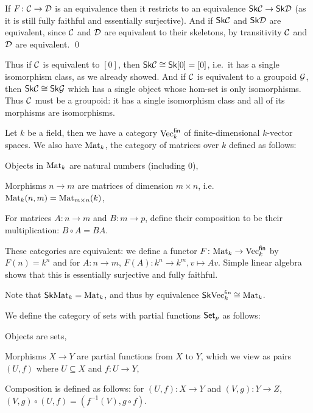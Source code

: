     If $F\colon{{\cal C}}\to{{\cal D}}$ is an equivalence then it restricts to an equivalence ${\sf Sk}{{\cal C}}\to{\sf Sk}{{\cal D}}$ (as it is still fully faithful and essentially surjective).
    And if ${\sf Sk}{{\cal C}}$ and ${\sf Sk}{{\cal D}}$ are equivalent, since ${{\cal C}}$ and ${{\cal D}}$ are equivalent to their skeletons, by transitivity ${{\cal C}}$ and ${{\cal D}}$ are equivalent.
    \qed

\eproof

Thus if ${{\cal C}}$ is equivalent to $[0]$, then ${\sf Sk}{{\cal C}}\cong{\sf Sk}[0]=[0]$, i.e.\ it has a single isomorphism class, as we already showed.
And if ${{\cal C}}$ is equivalent to a groupoid ${\cal G}$, then ${\sf Sk}{{\cal C}}\cong{\sf Sk}{\cal G}$ which has a single object whose hom-set is only isomorphisms.
Thus ${{\cal C}}$ must be a groupoid: it has a single isomorphism class and all of its morphisms are isomorphisms.

\bexam

    \def\Vec{{\rm Vec}}\def\fin{{\sf fin}}\def\mat{{\rm Mat}}
    Let $k$ be a field, then we have a category $\Vec_k^\fin$ of finite-dimensional $k$-vector spaces.
    We also have $\mat_k$, the category of matrices over $k$ defined as follows:
    \benum
        \item Objects in $\mat_k$ are natural numbers (including $0$),
        \item Morphisms $n\to m$ are matrices of dimension $m\times n$, i.e.\ $\mat_k(n,m)=\mat_{m\times n}(k)$,
        \item For matrices $A\colon n\to m$ and $B\colon m\to p$, define their composition to be their multiplication: $B\circ A=BA$.
    \eenum

    These categories are equivalent: we define a functor $F\colon\mat_k\to\Vec_k^\fin$ by $F(n)=k^n$ and for $A\colon n\to m$, $F(A)\colon k^n\to k^m,v\mapsto Av$.
    Simple linear algebra shows that this is essentially surjective and fully faithful.

    Note that $\sk\mat_k=\mat_k$, and thus by equivalence $\sk\Vec_k^\fin\cong\mat_k$.

\eexam

\bexam

    We define the category of sets with partial functions ${\sf Set}_p$ as follows:
    \benum
        \item Objects are sets,
        \item Morphisms $X\to Y$ are partial functions from $X$ to $Y$, which we view as pairs $(U,f)$ where $U\subseteq X$ and $f\colon U\to Y$,
        \item Composition is defined as follows: for $(U,f)\colon X\to Y$ and $(V,g)\colon Y\to Z$, $(V,g)\circ(U,f)=(f^{-1}(V),g\circ f)$.
    \eenum


